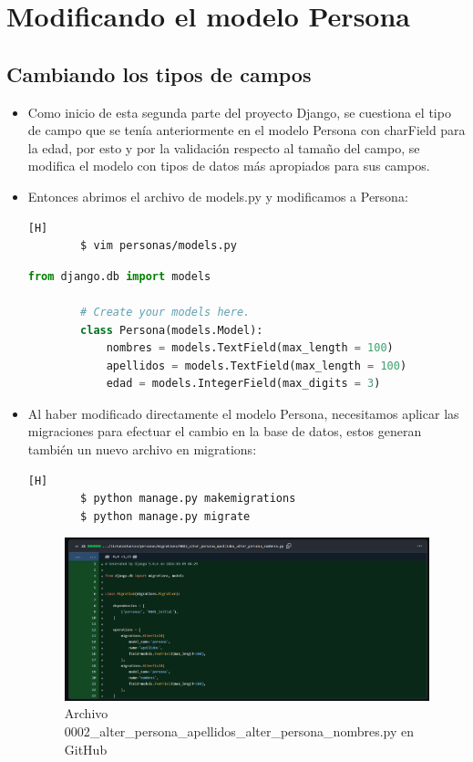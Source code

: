 \documentclass{article}
\begin{document}
	
    \section{Modificando el modelo Persona}

        \subsection{Cambiando los tipos de campos}
        \begin{itemize}	
            \item Como inicio de esta segunda parte del proyecto Django, se cuestiona el tipo de campo que se tenía anteriormente en el modelo Persona con charField para la edad, por esto y por la validación respecto al tamaño del campo, se modifica el modelo con tipos de datos más apropiados para sus campos.
            \item Entonces abrimos el archivo de models.py y modificamos a Persona:
            
        \begin{lstlisting}[language=bash,caption={Ingresando a models.py}][H]
        $ vim personas/models.py
        \end{lstlisting}
        \begin{lstlisting}[language=Python, caption={Modificación del modelo Persona}]
        from django.db import models
        
        # Create your models here.
        class Persona(models.Model):
            nombres = models.TextField(max_length = 100)
            apellidos = models.TextField(max_length = 100)
            edad = models.IntegerField(max_digits = 3)
        \end{lstlisting}

            \item Al haber modificado directamente el modelo Persona, necesitamos aplicar las migraciones para efectuar el cambio en la base de datos, estos generan también un nuevo archivo en migrations:
        
        \begin{lstlisting}[language=bash,caption={Makemigrations y migrate}][H]
        $ python manage.py makemigrations
        $ python manage.py migrate
        \end{lstlisting}
        
        \begin{figure}[H]
            \centering
            \includegraphics[width=0.7\linewidth]{img/Commit1.png}
            \caption{Archivo 0002\_alter\_persona\_apellidos\_alter\_persona\_nombres.py en GitHub}
            \label{fig:enter-label}
        \end{figure}


\end{itemize}
\end{document}
